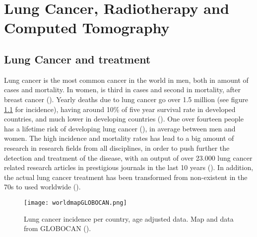 \chapter{Lung Cancer, Radiotherapy and Computed Tomography}

\section{Lung Cancer and treatment}


Lung cancer is the most common cancer in the world in men, both in amount of cases and mortality. In women, is third in cases and second in mortality, after breast cancer (\cite{WCR2014}). Yearly deaths due to lung cancer go over 1.5 million (see figure \ref{fig:world} for incidence), having around 10\% of five year survival rate in developed countries, and much lower in developing countries (\cite{CRUK2014}). One over fourteen people has a lifetime risk of developing lung cancer (\cite{Harrisons2012}), in average between men and women. The high incidence and mortality rates has lead to a big amount of research in research fields from all disciplines, in order to push further the detection and treatment of the disease, with an output of over 23.000 lung cancer related research articles in prestigious journals in the last 10 years (\cite{Nature2015}). In addition, the  actual lung cancer treatment has been transformed from non-existent in the 70s to used worldwide (\cite{Comis2003}).


\begin{figure}[ht]
\begin{center}
\texttt{[image: worldmapGLOBOCAN.png]}
\caption[Lung cancer incidence in the world]{Lung cancer incidence per country, age adjusted data. Map and data from {GLOBOCAN} (\cite{GLOBOCAN2010}).}
\label{fig:world}
\end{center}
\end{figure}



